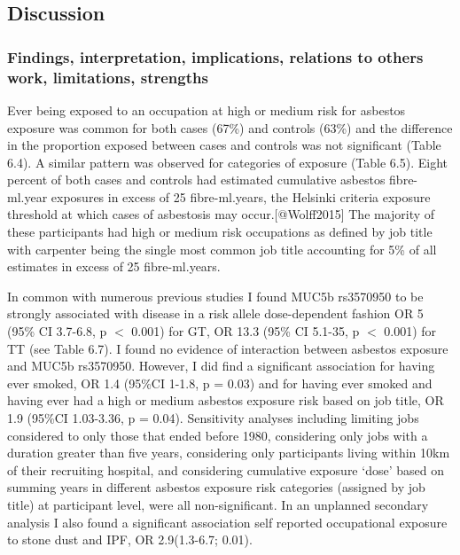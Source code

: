 \hypertarget{discussion}{%
\subsection{Discussion}\label{discussion}}

\hypertarget{findings-interpretation-implications-relations-to-others-work-limitations-strengths}{%
\subsubsection{Findings, interpretation, implications, relations to
others work, limitations,
strengths}\label{findings-interpretation-implications-relations-to-others-work-limitations-strengths}}

Ever being exposed to an occupation at high or medium risk for asbestos
exposure was common for both cases (67\%) and controls (63\%) and the
difference in the proportion exposed between cases and controls was not
significant (Table 6.4). A similar pattern was observed for categories
of exposure (Table 6.5). Eight percent of both cases and controls had
estimated cumulative asbestos fibre-ml.year exposures in excess of 25
fibre-ml.years, the Helsinki criteria exposure threshold at which cases
of asbestosis may occur.{[}@Wolff2015{]} The majority of these
participants had high or medium risk occupations as defined by job title
with carpenter being the single most common job title accounting for 5\%
of all estimates in excess of 25 fibre-ml.years.

In common with numerous previous studies I found MUC5b rs3570950 to be
strongly associated with disease in a risk allele dose-dependent fashion
OR 5 (95\% CI 3.7-6.8, p \ensuremath{<} 0.001) for GT, OR 13.3 (95\% CI
5.1-35, p \ensuremath{<} 0.001) for TT (see Table 6.7). I found no
evidence of interaction between asbestos exposure and MUC5b rs3570950.
However, I did find a significant association for having ever smoked, OR
1.4 (95\%CI 1-1.8, p = 0.03) and for having ever smoked and having ever
had a high or medium asbestos exposure risk based on job title, OR 1.9
(95\%CI 1.03-3.36, p = 0.04). Sensitivity analyses including limiting
jobs considered to only those that ended before 1980, considering only
jobs with a duration greater than five years, considering only
participants living within 10km of their recruiting hospital, and
considering cumulative exposure `dose' based on summing years in
different asbestos exposure risk categories (assigned by job title) at
participant level, were all non-significant. In an unplanned secondary
analysis I also found a significant association self reported
occupational exposure to stone dust and IPF, OR 2.9(1.3-6.7; 0.01).

